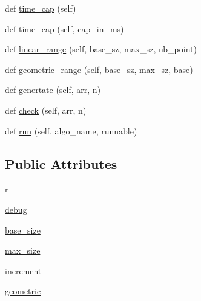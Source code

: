 \begin{DoxyCompactItemize}
\item 
def \hyperlink{classbridges_1_1sorting__benchmark_1_1_sorting_benchmark_a125d5bf68c5eb0fa1b319e37582fdc42}{time\+\_\+cap} (self)
\item 
def \hyperlink{classbridges_1_1sorting__benchmark_1_1_sorting_benchmark_af0705baca355e23e9e92f8d85a5fd33f}{time\+\_\+cap} (self, cap\+\_\+in\+\_\+ms)
\item 
def \hyperlink{classbridges_1_1sorting__benchmark_1_1_sorting_benchmark_ab5bfca8680018f4c043a78b25dbc1948}{linear\+\_\+range} (self, base\+\_\+sz, max\+\_\+sz, nb\+\_\+point)
\item 
def \hyperlink{classbridges_1_1sorting__benchmark_1_1_sorting_benchmark_ac9bc45a12b3ebab79d05785c01e4a99e}{geometric\+\_\+range} (self, base\+\_\+sz, max\+\_\+sz, base)
\item 
def \hyperlink{classbridges_1_1sorting__benchmark_1_1_sorting_benchmark_a95e9c117048a01ae3110ab430006e54e}{genertate} (self, arr, n)
\item 
def \hyperlink{classbridges_1_1sorting__benchmark_1_1_sorting_benchmark_ab75bf1d5d5e995c42a3853d8ed7a5a1f}{check} (self, arr, n)
\item 
def \hyperlink{classbridges_1_1sorting__benchmark_1_1_sorting_benchmark_a419601bff1043add1068cc957c924f49}{run} (self, algo\+\_\+name, runnable)
\end{DoxyCompactItemize}
\subsection*{Public Attributes}
\begin{DoxyCompactItemize}
\item 
\hyperlink{classbridges_1_1sorting__benchmark_1_1_sorting_benchmark_ae7fb15c11ff3cd6f17a2966f70d26a92}{r}
\item 
\hyperlink{classbridges_1_1sorting__benchmark_1_1_sorting_benchmark_abe5f172441e50097fecbd69fb724fd62}{debug}
\item 
\hyperlink{classbridges_1_1sorting__benchmark_1_1_sorting_benchmark_a5cf6780eab930f6dc96a517839c14bf7}{base\+\_\+size}
\item 
\hyperlink{classbridges_1_1sorting__benchmark_1_1_sorting_benchmark_af1aa3db22656da5aad6992547146e1c7}{max\+\_\+size}
\item 
\hyperlink{classbridges_1_1sorting__benchmark_1_1_sorting_benchmark_aa3b593efe1eac874fcb18a326b1b51d1}{increment}
\item 
\hyperlink{classbridges_1_1sorting__benchmark_1_1_sorting_benchmark_a3f5b4fe45cba8268f53716f6eb322a66}{geometric}
\end{DoxyCompactItemize}


